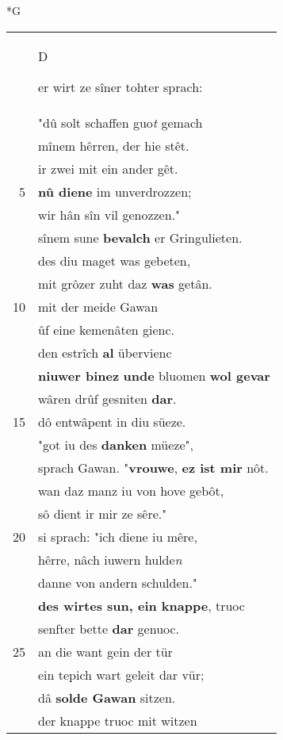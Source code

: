\documentclass[8pt,a4paper,notitlepage]{article}
\begin{document}
\begin{table}[ht]
\begin{minipage}[t]{0.5\linewidth}
\small
\begin{center}*G
\end{center}
\begin{tabular}{rl}
 & \begin{large}D\end{large}er wirt ze sîner tohter sprach:\\ 
 & "dû solt schaffen guo\textit{t} gemach\\ 
 & mînem hêrren, der hie stêt.\\ 
 & ir zwei mit ein ander gêt.\\ 
5 & \textbf{nû diene} im unverdrozzen;\\ 
 & wir hân sîn vil genozzen."\\ 
 & sînem sune \textbf{bevalch} er Gringulieten.\\ 
 & des diu maget was gebeten,\\ 
 & mit grôzer zuht daz \textbf{was} getân.\\ 
10 & mit der meide Gawan\\ 
 & ûf eine kemenâten gienc.\\ 
 & den estrîch \textbf{al} übervienc\\ 
 & \textbf{niuwer binez} \textbf{unde} bluomen \textbf{wol gevar}\\ 
 & wâren drûf gesniten \textbf{dar}.\\ 
15 & dô entwâpent in diu süeze.\\ 
 & "got iu des \textbf{danken} müeze",\\ 
 & sprach Gawan. "\textbf{vrouwe}, \textbf{ez ist mir} nôt.\\ 
 & wan daz manz iu von hove gebôt,\\ 
 & sô dient ir mir ze sêre."\\ 
20 & si sprach: "ich diene iu mêre,\\ 
 & hêrre, nâch iuwern hulde\textit{n}\\ 
 & danne von andern schulden."\\ 
 & \textbf{des wirtes sun, ein knappe}, truoc\\ 
 & senfter bette \textbf{dar} genuoc.\\ 
25 & an die want gein der tür\\ 
 & ein tepich wart geleit dar vür;\\ 
 & dâ \textbf{solde Gawan} sitzen.\\ 
 & der knappe truoc mit witzen\\ 

\end{tabular}
\end{minipage}
\end{table}
\end{document}
